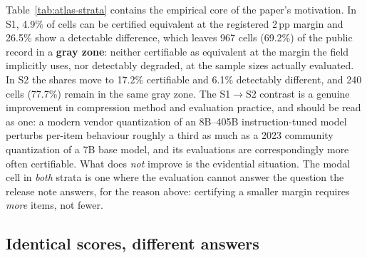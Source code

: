 Table~\ref{tab:atlas-strata} contains the empirical core of the paper's
motivation. In S1, 4.9\% of cells can be certified equivalent at the registered
2\,pp margin and 26.5\% show a detectable difference, which leaves
967 cells (69.2\%) of the public record in a \textbf{gray zone}:
neither certifiable as equivalent at the margin the field implicitly uses, nor
detectably degraded, at the sample sizes actually evaluated. In S2 the shares
move to 17.2\% certifiable and 6.1\% detectably different, and
240 cells (77.7\%) remain in the same gray zone.%
The S1$\to$S2 contrast is a genuine improvement in compression method and
evaluation practice, and should be read as one: a modern vendor quantization of
an 8B--405B instruction-tuned model perturbs per-item behaviour roughly a third
as much as a 2023 community quantization of a 7B base model, and its evaluations
are correspondingly more often certifiable. What does \emph{not} improve is the
evidential situation. The modal cell in \emph{both} strata is one where the
evaluation cannot answer the question the release note answers, for the reason
above: certifying a smaller margin requires \emph{more} items, not fewer.

\subsection{Identical scores, different answers}
\label{sec:atlas:identical}

